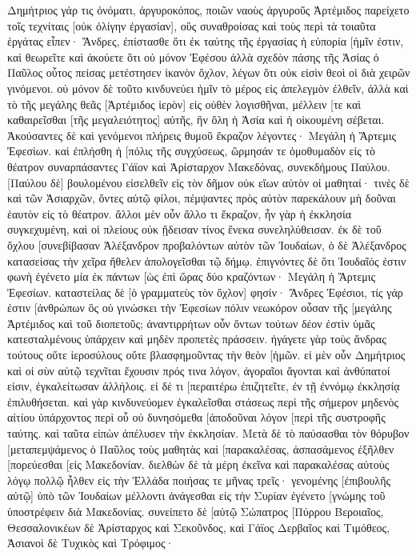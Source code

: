 Δημήτριος γάρ τις ὀνόματι, ἀργυροκόπος, ποιῶν ναοὺς ἀργυροῦς Ἀρτέμιδος παρείχετο τοῖς τεχνίταις [οὐκ ὀλίγην ἐργασίαν], 
οὓς συναθροίσας καὶ τοὺς περὶ τὰ τοιαῦτα ἐργάτας εἶπεν· Ἄνδρες, ἐπίστασθε ὅτι ἐκ ταύτης τῆς ἐργασίας ἡ εὐπορία [ἡμῖν ἐστιν, 
καὶ θεωρεῖτε καὶ ἀκούετε ὅτι οὐ μόνον Ἐφέσου ἀλλὰ σχεδὸν πάσης τῆς Ἀσίας ὁ Παῦλος οὗτος πείσας μετέστησεν ἱκανὸν ὄχλον, λέγων ὅτι οὐκ εἰσὶν θεοὶ οἱ διὰ χειρῶν γινόμενοι. 
οὐ μόνον δὲ τοῦτο κινδυνεύει ἡμῖν τὸ μέρος εἰς ἀπελεγμὸν ἐλθεῖν, ἀλλὰ καὶ τὸ τῆς μεγάλης θεᾶς [Ἀρτέμιδος ἱερὸν] εἰς οὐθὲν λογισθῆναι, μέλλειν [τε καὶ καθαιρεῖσθαι [τῆς μεγαλειότητος] αὐτῆς, ἣν ὅλη ἡ Ἀσία καὶ ἡ οἰκουμένη σέβεται. 
Ἀκούσαντες δὲ καὶ γενόμενοι πλήρεις θυμοῦ ἔκραζον λέγοντες· Μεγάλη ἡ Ἄρτεμις Ἐφεσίων. 
καὶ ἐπλήσθη ἡ [πόλις τῆς συγχύσεως, ὥρμησάν τε ὁμοθυμαδὸν εἰς τὸ θέατρον συναρπάσαντες Γάϊον καὶ Ἀρίσταρχον Μακεδόνας, συνεκδήμους Παύλου. 
[Παύλου δὲ] βουλομένου εἰσελθεῖν εἰς τὸν δῆμον οὐκ εἴων αὐτὸν οἱ μαθηταί· 
τινὲς δὲ καὶ τῶν Ἀσιαρχῶν, ὄντες αὐτῷ φίλοι, πέμψαντες πρὸς αὐτὸν παρεκάλουν μὴ δοῦναι ἑαυτὸν εἰς τὸ θέατρον. 
ἄλλοι μὲν οὖν ἄλλο τι ἔκραζον, ἦν γὰρ ἡ ἐκκλησία συγκεχυμένη, καὶ οἱ πλείους οὐκ ᾔδεισαν τίνος ἕνεκα συνεληλύθεισαν. 
ἐκ δὲ τοῦ ὄχλου [συνεβίβασαν Ἀλέξανδρον προβαλόντων αὐτὸν τῶν Ἰουδαίων, ὁ δὲ Ἀλέξανδρος κατασείσας τὴν χεῖρα ἤθελεν ἀπολογεῖσθαι τῷ δήμῳ. 
ἐπιγνόντες δὲ ὅτι Ἰουδαῖός ἐστιν φωνὴ ἐγένετο μία ἐκ πάντων [ὡς ἐπὶ ὥρας δύο κραζόντων· Μεγάλη ἡ Ἄρτεμις Ἐφεσίων. 
καταστείλας δὲ [ὁ γραμματεὺς τὸν ὄχλον] φησίν· Ἄνδρες Ἐφέσιοι, τίς γάρ ἐστιν [ἀνθρώπων ὃς οὐ γινώσκει τὴν Ἐφεσίων πόλιν νεωκόρον οὖσαν τῆς [μεγάλης Ἀρτέμιδος καὶ τοῦ διοπετοῦς; 
ἀναντιρρήτων οὖν ὄντων τούτων δέον ἐστὶν ὑμᾶς κατεσταλμένους ὑπάρχειν καὶ μηδὲν προπετὲς πράσσειν. 
ἠγάγετε γὰρ τοὺς ἄνδρας τούτους οὔτε ἱεροσύλους οὔτε βλασφημοῦντας τὴν θεὸν [ἡμῶν. 
εἰ μὲν οὖν Δημήτριος καὶ οἱ σὺν αὐτῷ τεχνῖται ἔχουσιν πρός τινα λόγον, ἀγοραῖοι ἄγονται καὶ ἀνθύπατοί εἰσιν, ἐγκαλείτωσαν ἀλλήλοις. 
εἰ δέ τι [περαιτέρω ἐπιζητεῖτε, ἐν τῇ ἐννόμῳ ἐκκλησίᾳ ἐπιλυθήσεται. 
καὶ γὰρ κινδυνεύομεν ἐγκαλεῖσθαι στάσεως περὶ τῆς σήμερον μηδενὸς αἰτίου ὑπάρχοντος περὶ οὗ οὐ δυνησόμεθα [ἀποδοῦναι λόγον [περὶ τῆς συστροφῆς ταύτης. καὶ ταῦτα εἰπὼν ἀπέλυσεν τὴν ἐκκλησίαν. 
Μετὰ δὲ τὸ παύσασθαι τὸν θόρυβον [μεταπεμψάμενος ὁ Παῦλος τοὺς μαθητὰς καὶ [παρακαλέσας, ἀσπασάμενος ἐξῆλθεν [πορεύεσθαι [εἰς Μακεδονίαν. 
διελθὼν δὲ τὰ μέρη ἐκεῖνα καὶ παρακαλέσας αὐτοὺς λόγῳ πολλῷ ἦλθεν εἰς τὴν Ἑλλάδα 
ποιήσας τε μῆνας τρεῖς· γενομένης [ἐπιβουλῆς αὐτῷ] ὑπὸ τῶν Ἰουδαίων μέλλοντι ἀνάγεσθαι εἰς τὴν Συρίαν ἐγένετο [γνώμης τοῦ ὑποστρέφειν διὰ Μακεδονίας. 
συνείπετο δὲ [αὐτῷ Σώπατρος [Πύρρου Βεροιαῖος, Θεσσαλονικέων δὲ Ἀρίσταρχος καὶ Σεκοῦνδος, καὶ Γάϊος Δερβαῖος καὶ Τιμόθεος, Ἀσιανοὶ δὲ Τυχικὸς καὶ Τρόφιμος· 
